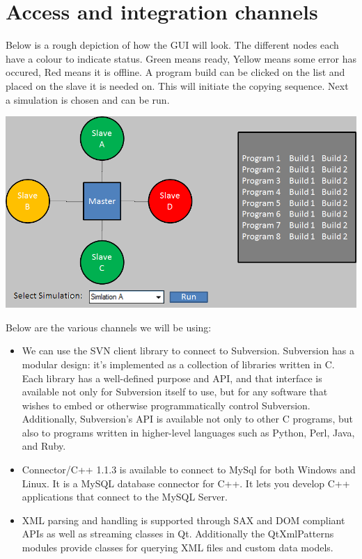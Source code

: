 \documentclass[a4paper,12pt,final]{article}
\begin{document}
\section{Access and integration channels}
Below is a rough depiction of how the GUI will look. The different nodes each have a colour to indicate status. Green means ready, Yellow means some error has occured, Red means it is offline. A program build can be clicked on the list and placed on the slave it is needed on. This will initiate the copying sequence. Next a simulation is chosen and can be run.\\
\begin{center}
  	\includegraphics[scale=0.65]{GuiPlan.png} 
  \end{center}
Below are the various channels we will be using:
\begin{itemize}
\item We can use the SVN client library to connect to Subversion. Subversion has a modular design: it's implemented as a collection of libraries written in C. Each library has a well-defined purpose and API, and that interface is available not only for Subversion itself to use, but for any software that wishes to embed or otherwise programmatically control Subversion. Additionally, Subversion's API is available not only to other C programs, but also to programs written in higher-level languages such as Python, Perl, Java, and Ruby.
\item Connector/C++ 1.1.3 is available to connect to MySql for both Windows and Linux. It is a MySQL database connector for C++. It lets you develop C++ applications that connect to the MySQL Server.
\item XML parsing and handling is supported through SAX and DOM compliant APIs as well as streaming classes in Qt. Additionally the QtXmlPatterns modules provide classes for querying XML files and custom data models.
\end{itemize}
\end{document}
